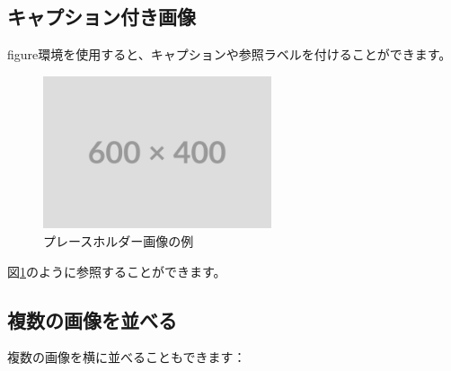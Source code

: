 \documentclass[12pt,a4paper,dvipdfmx]{jarticle}
\begin{document}
\subsection{キャプション付き画像}

figure環境を使用すると、キャプションや参照ラベルを付けることができます。

\begin{figure}[htbp]
  \centering
  \includegraphics[width=0.6\textwidth]{images/placeholder.png}
  \caption{プレースホルダー画像の例}
  \label{fig:placeholder}
\end{figure}

図\ref{fig:placeholder}のように参照することができます。

\subsection{複数の画像を並べる}

複数の画像を横に並べることもできます：
\end{document}
